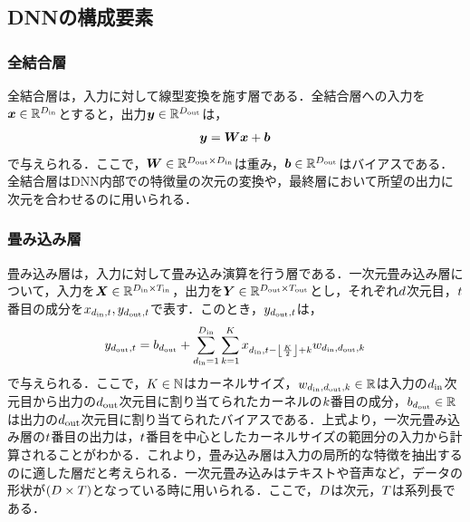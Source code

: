 \documentclass[12pt]{jarticle}
\numberwithin{equation}{section}    %
\numberwithin{figure}{section}      %
\numberwithin{table}{section}      %
\begin{document}
\subsection{DNNの構成要素}
\subsubsection{全結合層}
全結合層は，入力に対して線型変換を施す層である．全結合層への入力を$\bm{x} \in \mathbb{R}^{D_{\text{in}}}$とすると，出力$\bm{y} \in \mathbb{R}^{D_{\text{out}}}$は，
\begin{align}
    \bm{y} = \bm{W}\bm{x} + \bm{b}
\end{align}
で与えられる．ここで，$\bm{W} \in \mathbb{R}^{D_{\text{out}} \times D_{\text{in}}}$は重み，$\bm{b} \in \mathbb{R}^{D_{\text{out}}}$はバイアスである．全結合層はDNN内部での特徴量の次元の変換や，最終層において所望の出力に次元を合わせるのに用いられる．

\subsubsection{畳み込み層}
畳み込み層は，入力に対して畳み込み演算を行う層である．一次元畳み込み層について，入力を$\bm{X} \in \mathbb{R}^{D_{\text{in}} \times T_{\text{in}}}$，出力を$\bm{Y} \in \mathbb{R}^{D_{\text{out}} \times T_{\text{out}}}$とし，それぞれ$d$次元目，$t$番目の成分を$x_{d_{\text{in}}, t}, y_{d_{\text{out}}, t}$で表す．このとき，$y_{d_{\text{out}}, t}$は，
\begin{align}
    y_{d_{\text{out}}, t} = b_{d_{\text{out}}} + \sum_{d_{\text{in}} = 1}^{D_{\text{in}}} \sum_{k = 1}^{K} x_{d_{\text{in}}, t - \left\lfloor\frac{K}{2}\right\rfloor + k} w_{d_{\text{in}}, d_{\text{out}}, k}
\end{align}
で与えられる．ここで，$K \in \mathbb{N}$はカーネルサイズ，$w_{d_{\text{in}}, d_{\text{out}}, k} \in \mathbb{R}$は入力の$d_{\text{in}}$次元目から出力の$d_{\text{out}}$次元目に割り当てられたカーネルの$k$番目の成分，$b_{d_{\text{out}}} \in \mathbb{R}$は出力の$d_{\text{out}}$次元目に割り当てられたバイアスである．上式より，一次元畳み込み層の$t$番目の出力は，$t$番目を中心としたカーネルサイズの範囲分の入力から計算されることがわかる．これより，畳み込み層は入力の局所的な特徴を抽出するのに適した層だと考えられる．一次元畳み込みはテキストや音声など，データの形状が$\left(D \times T\right)$となっている時に用いられる．ここで，$D$は次元，$T$は系列長である．
\end{document}
